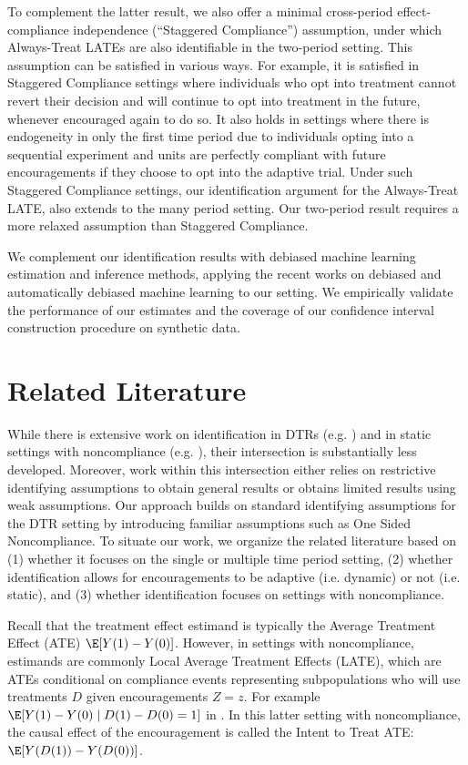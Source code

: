 To complement the latter result, we also offer a minimal cross-period effect-compliance independence (``Staggered Compliance'') assumption, under which Always-Treat LATEs are also identifiable in the two-period setting. 
This assumption can be satisfied in various ways. For example, it is satisfied in Staggered Compliance settings where individuals who opt into treatment cannot revert their decision and will continue to opt into treatment in the future, whenever encouraged again to do so. It also holds in settings where there is endogeneity in only the first time period due to individuals opting into a sequential experiment and units are perfectly compliant with future encouragements if they choose to opt into the adaptive trial.
Under such Staggered Compliance settings, our identification argument for the Always-Treat LATE, also extends to the many period setting. Our two-period result requires a more relaxed assumption than Staggered Compliance.

We complement our identification results with debiased machine learning estimation and inference methods, applying the recent works on debiased \citep{chernozhukov2018double} and automatically debiased machine learning \citep{chernozhukov2022automatic} to our setting. We empirically validate the performance of our estimates and the coverage of our confidence interval construction procedure on synthetic data.

\section{Related Literature}

While there is extensive work on identification in DTRs (e.g. \cite{murphy2003optimal,robins1986new}) and in static settings with noncompliance (e.g. \cite{imbens1994identification}), their intersection is substantially less developed. 
Moreover, work within this intersection either relies on restrictive identifying assumptions to obtain general results or obtains limited results using weak assumptions.
Our approach builds on standard identifying assumptions for the DTR setting by introducing familiar assumptions such as One Sided Noncompliance.
To situate our work, we organize the related literature based on (1) whether it focuses on the single or multiple time period setting, (2) whether identification allows for encouragements to be adaptive (i.e. dynamic) or not (i.e. static), and (3) whether identification focuses on settings with noncompliance.


Recall that the treatment effect estimand is typically the Average Treatment Effect (ATE) $\E[Y(1) - Y(0)]$.
However, in settings with noncompliance, estimands are commonly Local Average Treatment Effects (LATE), which are ATEs conditional on compliance events representing subpopulations who will use treatments $D$ given encouragements $Z=z$.
For example $\E[Y(1) - Y(0) \mid D(1)-D(0)=1]$ in \cite{imbens1994identification}.
In this latter setting with noncompliance, the causal effect of the encouragement is called the Intent to Treat ATE: $\E[Y(D(1)) - Y(D(0))]$.

